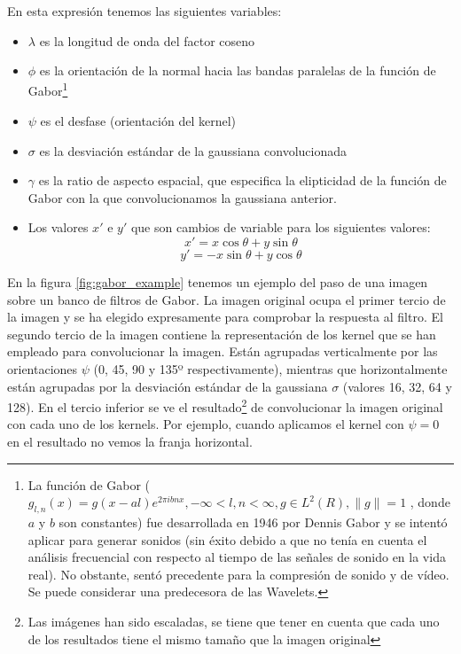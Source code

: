 En esta expresión tenemos las siguientes variables:
\begin{itemize}
	\item{$\lambda$ es la longitud de onda del factor coseno}
	\item{$\phi$ es la orientación de la normal hacia las bandas paralelas de la función de Gabor\footnote{La función de Gabor ($g_{l,n}(x)=g(x-al)e^{2\pi ibnx}, -\infty < l,n < \infty, g\in L^2(R), \parallel g \parallel=1$ , donde $a$ y $b$ son constantes) fue desarrollada en 1946 por Dennis Gabor y se intentó aplicar para generar sonidos (sin éxito debido a que no tenía en cuenta el análisis frecuencial con respecto al tiempo de las señales de sonido en la vida real). No obstante, sentó precedente para la compresión de sonido y de vídeo. Se puede considerar una predecesora de las Wavelets. } }
	\item{$\psi$ es el desfase (orientación del kernel) }
	\item{$\sigma$ es la desviación estándar de la gaussiana convolucionada}
	\item{$\gamma$ es la ratio de aspecto espacial, que especifica la elipticidad de la función de Gabor con la que convolucionamos la gaussiana anterior.}
	\item{Los valores $ x'$ e $y'$ que son cambios de variable para los siguientes valores:} 
		\[ x' =x\cos\theta + y\sin\theta \] 
		\[y'=-x\sin\theta + y\cos\theta \] 
\end{itemize}

En la figura \ref{fig:gabor_example} tenemos un ejemplo del paso de una imagen sobre un banco de filtros de Gabor. La imagen original ocupa el primer tercio de la imagen y se ha elegido expresamente para comprobar la respuesta al filtro. El segundo tercio de la imagen contiene la representación de los kernel que se han empleado para convolucionar la imagen. Están agrupadas verticalmente por las orientaciones $\psi$ (0, 45, 90 y 135º respectivamente), mientras que horizontalmente están agrupadas por la desviación estándar de la gaussiana $\sigma$ (valores 16, 32, 64 y 128). En el tercio inferior se ve el resultado\footnote{Las imágenes han sido escaladas, se tiene que tener en cuenta que cada uno de los resultados tiene el mismo tamaño que la imagen original} de convolucionar la imagen original con cada uno de los kernels. Por ejemplo, cuando aplicamos el kernel con $\psi=0$ en el resultado no vemos la franja horizontal.

